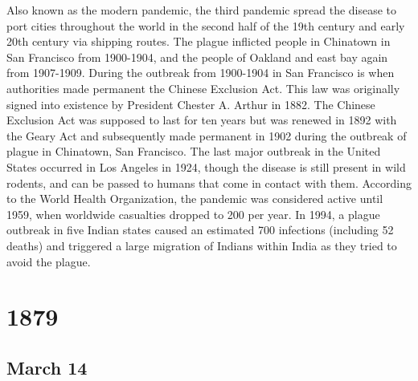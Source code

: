 \documentclass[11pt]{report}
\begin{document}
Also known as the modern pandemic, the third pandemic spread the disease to port cities throughout the world in the second half of the 19th century and early 20th century via shipping routes. The plague inflicted people in Chinatown in San Francisco from 1900-1904, and the people of Oakland and east bay again from 1907-1909. During the outbreak from 1900-1904 in San Francisco is when authorities made permanent the Chinese Exclusion Act. This law was originally signed into existence by President Chester A. Arthur in 1882. The Chinese Exclusion Act was supposed to last for ten years but was renewed in 1892 with the Geary Act and subsequently made permanent in 1902 during the outbreak of plague in Chinatown, San Francisco. The last major outbreak in the United States occurred in Los Angeles in 1924, though the disease is still present in wild rodents, and can be passed to humans that come in contact with them. According to the World Health Organization, the pandemic was considered active until 1959, when worldwide casualties dropped to 200 per year. In 1994, a plague outbreak in five Indian states caused an estimated 700 infections (including 52 deaths) and triggered a large migration of Indians within India as they tried to avoid the plague.

\chapter{1879}
\section{March 14}
\end{document}

